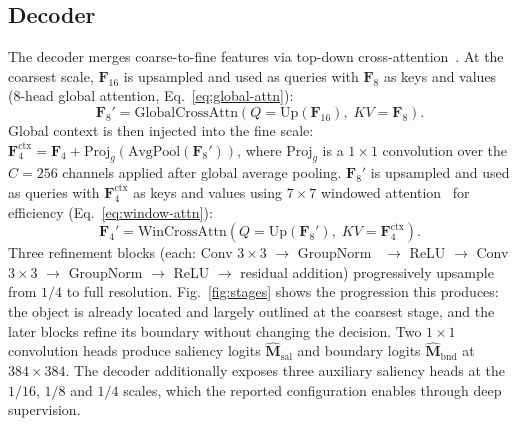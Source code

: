 \documentclass[10pt,a4paper,twocolumn,twoside]{article}
\newcommand{\bF}{\mathbf{F}}
\newcommand{\bM}{\mathbf{M}}
\begin{document}
\subsection{Decoder}
\label{sec:decoder}
The decoder merges coarse-to-fine features via top-down cross-attention~\cite{vaswani2017attention}.
At the coarsest scale, $\bF_{16}$ is upsampled and used as queries with $\bF_8$ as keys and values (8-head global attention, Eq.~\eqref{eq:global-attn}):
\begin{equation}
  \bF_8' = \text{GlobalCrossAttn}(Q = \text{Up}(\bF_{16}),\; KV = \bF_8).
  \label{eq:global-attn}
\end{equation}
Global context is then injected into the fine scale: $\bF_4^{\text{ctx}} = \bF_4 + \text{Proj}_g(\text{AvgPool}(\bF_8'))$, where $\text{Proj}_g$ is a $1{\times}1$ convolution over the $C{=}256$ channels applied after global average pooling.
$\bF_8'$ is upsampled and used as queries with $\bF_4^{\text{ctx}}$ as keys and values using $7{\times}7$ windowed attention~\cite{liu2021swin} for efficiency (Eq.~\eqref{eq:window-attn}):
\begin{equation}
  \bF_4' = \text{WinCrossAttn}(Q = \text{Up}(\bF_8'),\; KV = \bF_4^{\text{ctx}}).
  \label{eq:window-attn}
\end{equation}
Three refinement blocks (each: Conv $3{\times}3$ $\to$ GroupNorm~\cite{wu2018groupnorm} $\to$ ReLU $\to$ Conv $3{\times}3$ $\to$ GroupNorm $\to$ ReLU $\to$ residual addition) progressively upsample from $1/4$ to full resolution.
Fig.~\ref{fig:stages} shows the progression this produces: the object is already located and
largely outlined at the coarsest stage, and the later blocks refine its boundary without
changing the decision.
Two $1{\times}1$ convolution heads produce saliency logits $\hat{\bM}_{\text{sal}}$ and boundary logits $\hat{\bM}_{\text{bnd}}$ at $384{\times}384$. The decoder additionally exposes three auxiliary saliency heads at the $1/16$, $1/8$ and $1/4$ scales, which the reported configuration enables through deep supervision.
\end{document}
